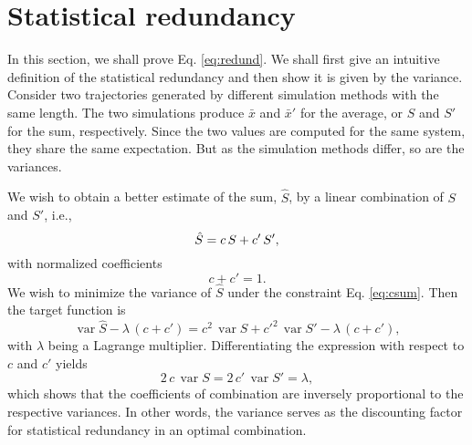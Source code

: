 \documentclass[12pt]{article}
\begin{document}
\section{\label{sec:redund}
Statistical redundancy}


In this section,
we shall prove Eq. \eqref{eq:redund}.
%
We shall first give an intuitive definition
of the statistical redundancy
and then show it is given by the variance.
%
Consider two trajectories generated by
different simulation methods with the same length.
%
The two simulations produce
$\bar x$ and $\bar x'$ for the average,
or
$S$ and $S'$ for the sum, respectively.
%
Since the two values are computed for the same system,
they share the same expectation.
%
But as the simulation methods differ, so are the variances.

We wish to obtain a better estimate of the sum, $\hat S$,
by a linear combination of $S$ and $S'$, i.e.,
\begin{equation}
  \hat S
  =
  c \, S + c' \, S',
  \notag
\end{equation}
%
with normalized coefficients
%
\begin{equation}
  c + c' = 1.
  \label{eq:csum}
\end{equation}
%
We wish to minimize the variance of $\hat S$ under the constraint
Eq. \eqref{eq:csum}.  Then the target function is
$$
\operatorname{var} \hat S - \lambda \, (c + c')
=
c^2 \, \operatorname{var} S
+
c'^2 \, \operatorname{var} S'
-
\lambda \, (c + c'),
$$
with $\lambda$ being a Lagrange multiplier.
%
Differentiating the expression with respect to $c$ and $c'$ yields
$$
2 \, c \, \operatorname{var} S
=
2 \, c' \, \operatorname{var} S'
=
\lambda,
$$
which shows that the coefficients of combination
are inversely proportional to the respective variances.
%
In other words, the variance serves as the discounting factor
for statistical redundancy in an optimal combination.
\end{document}
